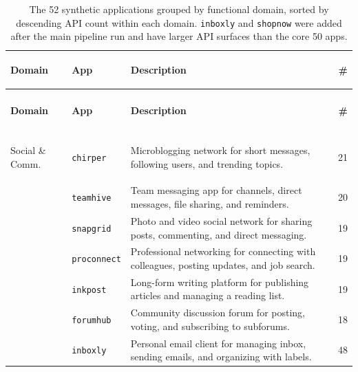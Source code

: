 \documentclass[11pt]{article}
\newcommand{\app}[1]{\texttt{#1}}
\begin{document}
\setlength{\LTcapwidth}{\linewidth}
{\small
\setlength{\tabcolsep}{4pt}
\renewcommand{\arraystretch}{0.85}
\begin{longtable}{@{}>{\bfseries\raggedright\arraybackslash}p{2.65cm} >{\raggedright\arraybackslash}p{2.55cm} >{\raggedright\arraybackslash}p{8.30cm} r@{}}
\caption{The 52 synthetic applications grouped by functional domain, sorted by descending API count within each domain. \texttt{inboxly} and \texttt{shopnow} were added after the main pipeline run and have larger API surfaces than the core 50 apps.}
\label{tab:apps} \\
\toprule
\textbf{Domain} & \textbf{App} & \textbf{Description} & \textbf{\#} \\
\midrule
\endfirsthead
\multicolumn{4}{l}{\small\textit{Table~\ref{tab:apps} continued}} \\[1pt]
\toprule
\textbf{Domain} & \textbf{App} & \textbf{Description} & \textbf{\#} \\
\midrule
\endhead
\midrule
\multicolumn{4}{r}{\small\textit{Continued on next page}} \\
\endfoot
\bottomrule
\endlastfoot

Social \& Comm.
  & \app{chirper}    & Microblogging network for short messages, following users, and trending topics.          & 21 \\
  & \app{teamhive}   & Team messaging app for channels, direct messages, file sharing, and reminders.            & 20 \\
  & \app{snapgrid}   & Photo and video social network for sharing posts, commenting, and direct messaging.        & 19 \\
  & \app{proconnect} & Professional networking for connecting with colleagues, posting updates, and job search.  & 19 \\
  & \app{inkpost}    & Long-form writing platform for publishing articles and managing a reading list.            & 19 \\
  & \app{forumhub}   & Community discussion forum for posting, voting, and subscribing to subforums.              & 18 \\
  & \app{inboxly}    & Personal email client for managing inbox, sending emails, and organizing with labels.      & 48 \\
\midrule


\end{longtable}}
\end{document}

